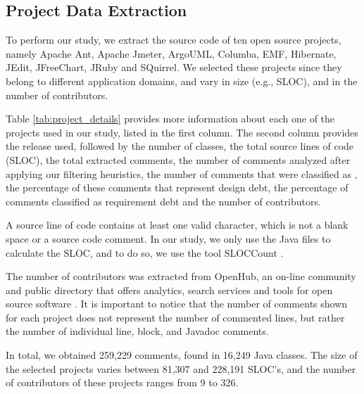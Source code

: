 \subsection{Project Data Extraction} %
\label{sub:data_extraction}

To perform our study, we extract the source code of ten open source projects, namely Apache Ant, Apache Jmeter, ArgoUML, Columba, EMF, Hibernate, JEdit, JFreeChart, JRuby and SQuirrel. We selected these projects since they belong to different application domains, and vary in size (e.g., SLOC), and in the number of contributors. 

Table \ref{tab:project_details} provides more information about each one of the projects used in our study, listed in the first column. The second column provides the release used, followed by the number of classes, the total source lines of code (SLOC), the total extracted comments, the number of comments analyzed after applying our filtering heuristics, the number of comments that were classified as \SATD, the percentage of these comments that represent design debt, the percentage of \SATD comments classified as requirement debt and the number of contributors. 

A source line of code contains at least one valid character, which is not a blank space or a source code comment. In our study, we only use the Java files to calculate the SLOC, and to do so, we use the tool SLOCCount \cite{wheeler2004:home}. 

The number of contributors was extracted from OpenHub, an on-line community and public directory that offers analytics, search services and tools for open source software \cite{Openhub:home}. It is important to notice that the number of comments shown for each project does not represent the number of commented lines, but rather the number of individual line, block, and Javadoc comments. 

In total, we obtained 259,229 comments, found in 16,249 Java classes. The size of the selected projects varies between 81,307 and 228,191 SLOC's, and the number of contributors of these projects ranges from 9 to 326. 

